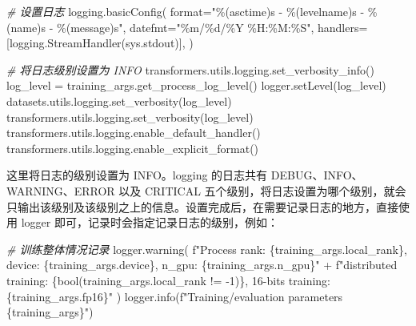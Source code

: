 \documentclass[
]{article}
\newenvironment{Shaded}{}{}
\newcommand{\BuiltInTok}[1]{\textcolor[rgb]{0.00,0.50,0.00}{#1}}
\newcommand{\CommentTok}[1]{\textcolor[rgb]{0.38,0.63,0.69}{\textit{#1}}}
\newcommand{\DecValTok}[1]{\textcolor[rgb]{0.25,0.63,0.44}{#1}}
\newcommand{\NormalTok}[1]{#1}
\newcommand{\OperatorTok}[1]{\textcolor[rgb]{0.40,0.40,0.40}{#1}}
\newcommand{\SpecialCharTok}[1]{\textcolor[rgb]{0.25,0.44,0.63}{#1}}
\newcommand{\SpecialStringTok}[1]{\textcolor[rgb]{0.73,0.40,0.53}{#1}}
\newcommand{\StringTok}[1]{\textcolor[rgb]{0.25,0.44,0.63}{#1}}
\begin{document}
\begin{Shaded}
\begin{Highlighting}[]
\CommentTok{\# 设置日志}
\NormalTok{logging.basicConfig(}
    \BuiltInTok{format}\OperatorTok{=}\StringTok{"}\SpecialCharTok{\%(asctime)s}\StringTok{ {-} }\SpecialCharTok{\%(levelname)s}\StringTok{ {-} }\SpecialCharTok{\%(name)s}\StringTok{ {-} }\SpecialCharTok{\%(message)s}\StringTok{"}\NormalTok{,}
\NormalTok{    datefmt}\OperatorTok{=}\StringTok{"\%m/}\SpecialCharTok{\%d}\StringTok{/\%Y \%H:\%M:\%S"}\NormalTok{,}
\NormalTok{    handlers}\OperatorTok{=}\NormalTok{[logging.StreamHandler(sys.stdout)],}
\NormalTok{)}

\CommentTok{\# 将日志级别设置为 INFO}
\NormalTok{transformers.utils.logging.set\_verbosity\_info()}
\NormalTok{log\_level }\OperatorTok{=}\NormalTok{ training\_args.get\_process\_log\_level()}
\NormalTok{logger.setLevel(log\_level)}
\NormalTok{datasets.utils.logging.set\_verbosity(log\_level)}
\NormalTok{transformers.utils.logging.set\_verbosity(log\_level)}
\NormalTok{transformers.utils.logging.enable\_default\_handler()}
\NormalTok{transformers.utils.logging.enable\_explicit\_format()}
\end{Highlighting}
\end{Shaded}

这里将日志的级别设置为 INFO。logging 的日志共有
DEBUG、INFO、WARNING、ERROR 以及 CRITICAL
五个级别，将日志设置为哪个级别，就会只输出该级别及该级别之上的信息。设置完成后，在需要记录日志的地方，直接使用
logger 即可，记录时会指定记录日志的级别，例如：

\begin{Shaded}
\begin{Highlighting}[]
\CommentTok{\# 训练整体情况记录}
\NormalTok{logger.warning(}
    \SpecialStringTok{f"Process rank: }\SpecialCharTok{\{}\NormalTok{training\_args}\SpecialCharTok{.}\NormalTok{local\_rank}\SpecialCharTok{\}}\SpecialStringTok{, device: }\SpecialCharTok{\{}\NormalTok{training\_args}\SpecialCharTok{.}\NormalTok{device}\SpecialCharTok{\}}\SpecialStringTok{, n\_gpu: }\SpecialCharTok{\{}\NormalTok{training\_args}\SpecialCharTok{.}\NormalTok{n\_gpu}\SpecialCharTok{\}}\SpecialStringTok{"}
    \OperatorTok{+} \SpecialStringTok{f"distributed training: }\SpecialCharTok{\{}\BuiltInTok{bool}\NormalTok{(training\_args.local\_rank }\OperatorTok{!=} \OperatorTok{{-}}\DecValTok{1}\NormalTok{)}\SpecialCharTok{\}}\SpecialStringTok{, 16{-}bits training: }\SpecialCharTok{\{}\NormalTok{training\_args}\SpecialCharTok{.}\NormalTok{fp16}\SpecialCharTok{\}}\SpecialStringTok{"}
\NormalTok{)}
\NormalTok{logger.info(}\SpecialStringTok{f"Training/evaluation parameters }\SpecialCharTok{\{}\NormalTok{training\_args}\SpecialCharTok{\}}\SpecialStringTok{"}\NormalTok{)}
\end{Highlighting}
\end{Shaded}
\end{document}
